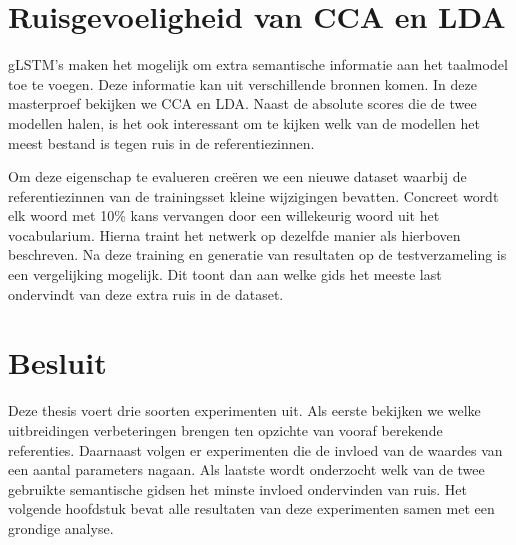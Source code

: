 \section{Ruisgevoeligheid van CCA en LDA} %
\label{sec:ruisgevoeligheid_van_cca_en_lda_exp}
gLSTM's maken het mogelijk om extra semantische informatie aan het taalmodel toe te voegen. Deze informatie kan uit verschillende bronnen komen. In deze masterproef bekijken we CCA en LDA. Naast de absolute scores die de twee modellen halen, is het ook interessant om te kijken welk van de modellen het meest bestand is tegen ruis in de referentiezinnen.

Om deze eigenschap te evalueren cre\"eren we een nieuwe dataset waarbij de referentiezinnen van de trainingsset kleine wijzigingen bevatten.
Concreet wordt elk woord met 10\% kans vervangen door een willekeurig woord uit het vocabularium. Hierna traint het netwerk op dezelfde manier als hierboven beschreven. Na deze training en generatie van resultaten op de testverzameling is een vergelijking mogelijk. Dit toont dan aan welke gids het meeste last ondervindt van deze extra ruis in de dataset.

\section{Besluit}
Deze thesis voert drie soorten experimenten uit. Als eerste bekijken we welke uitbreidingen verbeteringen brengen ten opzichte van vooraf berekende referenties. Daarnaast volgen er experimenten die de invloed van de waardes van een aantal parameters nagaan. Als laatste wordt onderzocht welk van de twee gebruikte semantische gidsen het minste invloed ondervinden van ruis.
Het volgende hoofdstuk bevat alle resultaten van deze experimenten samen met een grondige analyse.


